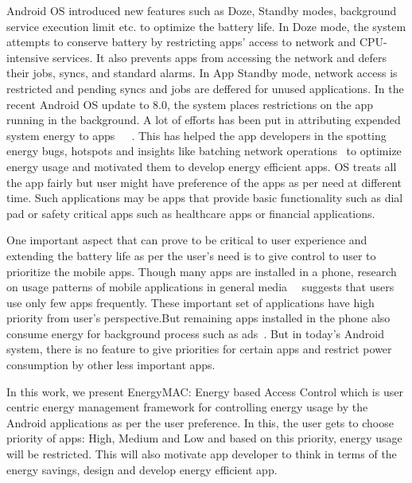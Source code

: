  
Android OS introduced new features such as Doze, Standby modes, background service execution limit etc. to optimize the battery life. In Doze mode, the system attempts to conserve battery by restricting apps' access to network and CPU-intensive services. It also prevents apps from accessing the network and defers their jobs, syncs, and standard alarms. In App Standby mode, network access is restricted and pending syncs and jobs are deffered for unused applications. In the recent Android OS update to 8.0, the system places restrictions on the app running in the background. A lot of efforts has been put in attributing expended system energy to apps~\cite{pathak2012energy}~\cite{yoon2012appscope}~\cite{zhang2010accurate}. This has helped the app developers in the spotting energy bugs, hotspots\cite{banerjee2014detecting} and insights like batching network operations~\cite{pathak2012energy} to optimize energy usage and motivated them to develop energy efficient apps. OS treats all the app fairly but user might have preference of the apps as per need at different time. Such applications may be apps that provide basic functionality such as dial pad or safety critical apps such as healthcare apps or financial applications.
 
One important aspect that can prove to be critical to user experience and extending the battery life as per the user's need is to give control to user to prioritize the mobile apps. Though many apps are installed in a phone, research on usage patterns of mobile applications in general media~\cite{techcrunch85}~\cite{techcrunch63} suggests that users use only few apps frequently. These important set of applications have high priority from user's perspective.But remaining apps installed in the phone also consume energy for background process such as ads~\cite{stevens2012investigating}. But in today's Android system, there is no feature to give priorities for certain apps and restrict power consumption by other less important apps. 

In this work, we present EnergyMAC: Energy based Access Control which is user centric energy management framework for controlling energy usage by the Android applications as per the user preference. In this, the user gets to choose priority of apps: High, Medium and Low and based on this priority, energy usage will be restricted.  This will also motivate app developer to think in terms of the energy savings, design and develop energy efficient app.

